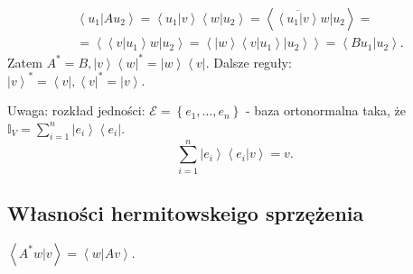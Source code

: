 \documentclass[../main.tex]{subfiles}
\begin{document}
\begin{align*}
    &\left<u_1|Au_2 \right> = \left<u_1|v \right>\left<w|u_2 \right> = \left<\overline{\left<u_1|v \right>}w|u_2 \right> =\\
    &= \left<\left<v|u_1 \right>w|u_2 \right> = \left<\left|w \right>\left<v|u_1 \right>\left|u_2 \right> \right> = \left<Bu_1|u_2 \right>
.\end{align*}
Zatem $A^* = B, \left|v \right>\left< w\right|^* = \left|w \right>\left<v \right|$.
Dalsze reguły:\\
$\left|v \right>^* = \left<v \right|, \left<v \right|^* = \left|v \right>$.

Uwaga: rozkład jedności: $\mathcal{E} = \left\{ e_1,\ldots,e_n \right\} $ - baza ortonormalna taka, że $\mathbb{I}_V = \sum_{i=1}^n \left|e_i \right>\left<e_i \right|$.
\[
\sum_{i=1}^n \left|e_i \right>\left<e_i|v \right> = v
.\]

\subsection{Własności hermitowskeigo sprzężenia}
$\left<A^*w|v \right> = \left<w|Av \right>$.
\end{document}
